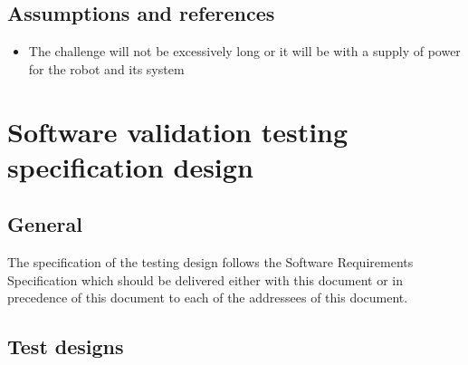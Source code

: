 \section{Assumptions and references}

\begin{itemize}
    \item The challenge will not be excessively long or it will be with a supply of power for the robot and its system
\end{itemize}

\newpage


\chapter{Software validation testing specification design}
\label{Requirements}

\section{General}

The specification of the testing design follows the Software Requirements Specification which should be delivered either with this document or in precedence of this document to each of the addressees of this document.

\section{Test designs}


\def\srs#1#2#3#4#5{\item\textbf{Test design \textit{#1}}

\textbf{General}:

This test design establishes procedures for the validation on the #3 as specified in the Software Requirements Specification (as \textbf{SRS\_#2}).

\textbf{Features to be tested}:

This test design will test the following features: #4

\textbf{Approach refinements}:

#5

}

